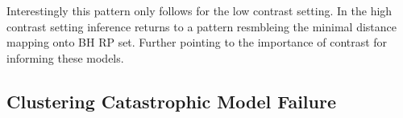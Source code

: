 %
Interestingly this pattern only follows for the low contrast setting. In the high
contrast setting inference returns to a pattern resmbleing the minimal distance
mapping onto BH RP set. Further pointing to the importance of contrast for informing
these models.

%

%
\subsection{Clustering Catastrophic Model Failure}

